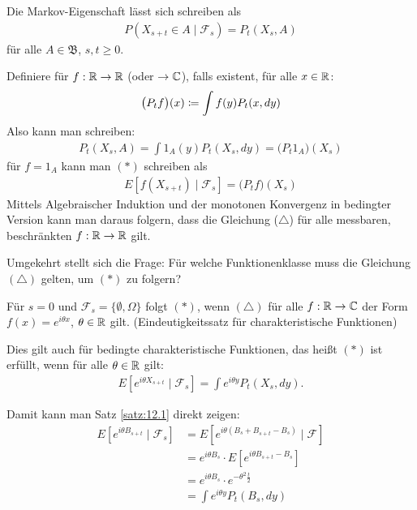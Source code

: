 \documentclass[a4paper,twoside,DIV15,BCOR12mm]{scrbook}
\newcommand{\cF}{\mathcal F}
\newcommand{\borel}{{\mathfrak B}}
\begin{document}
\begin{bemerkung}
Die Markov-Eigenschaft lässt sich schreiben als
\begin{align*}
P(X_{s+t}\in A\mid \cF_s) = P_t(X_s,A) \tag{$*$}
\end{align*}
für alle $A\in\borel$, $s,t\ge 0$.

Definiere für $f:\mathbb{R}\to\mathbb{R}$ (oder $\to \mathbb{C}$), falls existent, für alle $x\in \mathbb{R}$:
\begin{align*}
\big(P_tf\big)(x) \da \int f(y) P_t(x,dy)
\end{align*}
Also kann man schreiben:
\begin{align*}
P_t(X_s,A) = \int 1_A(y) P_t(X_s,dy) = \big(P_t1_A\big)(X_s)
\end{align*}
für $f=1_A$ kann man $(*)$ schreiben als
\begin{align*}
E[f(X_{s+t}) \mid \cF_s] = \big(P_tf\big) (X_s) \tag{$\triangle$}
\end{align*}
Mittels Algebraischer Induktion und der monotonen Konvergenz in bedingter Version kann man daraus folgern, dass die Gleichung ($\triangle$) für alle messbaren, beschränkten $f:\mathbb{R}\to\mathbb{R}$ gilt.

Umgekehrt stellt sich die Frage: Für welche Funktionenklasse muss die Gleichung $(\triangle)$ gelten, um $(*)$ zu folgern?

Für $s=0$ und $\cF_s=\{\emptyset, \Omega\}$ folgt $(*)$, wenn $(\triangle)$ für alle $f:\mathbb{R}\to \mathbb{C}$ der Form $f(x) = e^{i\theta x}$, $\theta\in \mathbb{R}$ gilt. (Eindeutigkeitssatz für charakteristische Funktionen)

Dies gilt auch für bedingte charakteristische Funktionen, das heißt $(*)$ ist erfüllt, wenn für alle $\theta\in \mathbb{R}$ gilt:
\begin{align*}
E[e^{i\theta X_{s+t}}\mid \cF_s] = \int e^{i\theta y}P_t(X_s,dy).
\end{align*}

Damit kann man Satz \ref{satz:12.1} direkt zeigen:
\begin{align*}
E[e^{i\theta B_{s+t}}\mid \cF_s] &= E[e^{i\theta(B_s+B_{s+t}-B_s)}\mid \cF] \\
&= e^{i\theta B_s} \cdot E[e^{i\theta B_{s+t}-B_s}] \\
&= e^{i\theta B_s} \cdot e^{-\theta^2\frac t2} \\
&= \int e^{i\theta y}P_t(B_s,dy)
\end{align*}
\end{bemerkung}
\end{document}
